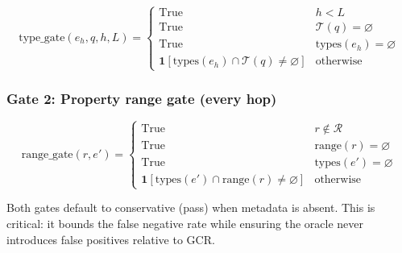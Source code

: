 \documentclass[11pt,twoside]{article}
\begin{document}
\[
	\text{type\_gate}(e_h, q, h, L) =
	\begin{cases}
		\text{True}                                                        & h < L \\
		\text{True}                                                        & \mathcal{T}(q) = \varnothing \\
		\text{True}                                                        & \text{types}(e_h) = \varnothing \\
		\mathbf{1}[\text{types}(e_h) \cap \mathcal{T}(q) \neq \varnothing] & \text{otherwise}
	\end{cases}
\]

\subsubsection{Gate 2: Property range gate (every hop)}

\[
	\text{range\_gate}(r, e') =
	\begin{cases}
		\text{True}                                                        & r \notin \mathcal{R} \\
		\text{True}                                                        & \text{range}(r) = \varnothing \\
		\text{True}                                                        & \text{types}(e') = \varnothing \\
		\mathbf{1}[\text{types}(e') \cap \text{range}(r) \neq \varnothing] & \text{otherwise}
	\end{cases}
\]

Both gates default to conservative (pass) when metadata is absent. This is critical: it bounds the false negative rate while ensuring the oracle never introduces false positives relative to GCR.
\end{document}
